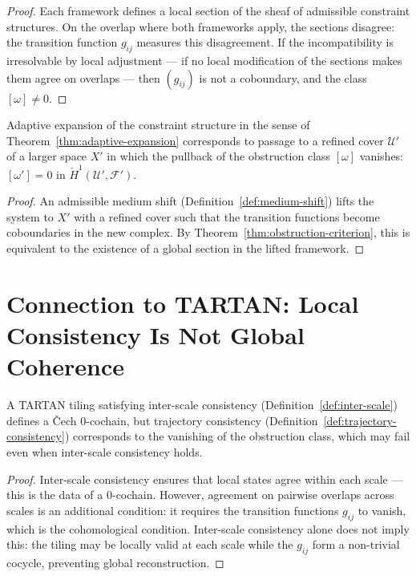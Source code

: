 \documentclass[11pt,openany]{book}
\begin{document}
\begin{proof}
Each framework defines a local section of the sheaf of
admissible constraint structures.  On the overlap where
both frameworks apply, the sections disagree: the
transition function $g_{ij}$ measures this disagreement.
If the incompatibility is irresolvable by local
adjustment — if no local modification of the sections
makes them agree on overlaps — then $(g_{ij})$ is not a
coboundary, and the class $[\omega] \neq 0$.
\end{proof}

\begin{corollary}
\label{cor:expansion-trivialisation}
Adaptive expansion of the constraint structure in the sense
of Theorem~\ref{thm:adaptive-expansion} corresponds to
passage to a refined cover $\mathcal{U}'$ of a larger
space $X'$ in which the pullback of the obstruction class
$[\omega]$ vanishes: $[\omega'] = 0$ in
$\check{H}^1(\mathcal{U}', \mathcal{F}')$.
\end{corollary}

\begin{proof}
An admissible medium shift (Definition~\ref{def:medium-shift})
lifts the system to $X'$ with a refined cover such that the
transition functions become coboundaries in the new complex.
By Theorem~\ref{thm:obstruction-criterion}, this is
equivalent to the existence of a global section in the
lifted framework.
\end{proof}

\section{Connection to TARTAN: Local Consistency Is Not Global Coherence}
\label{sec:tartan-connection}

\begin{proposition}
\label{prop:tartan-obstruction-app}
A TARTAN tiling satisfying inter-scale consistency
(Definition~\ref{def:inter-scale}) defines a Čech
$0$-cochain, but trajectory consistency
(Definition~\ref{def:trajectory-consistency}) corresponds
to the vanishing of the obstruction class, which may fail
even when inter-scale consistency holds.
\end{proposition}

\begin{proof}
Inter-scale consistency ensures that local states agree
within each scale — this is the data of a $0$-cochain.
However, agreement on pairwise overlaps across scales is an
additional condition: it requires the transition functions
$g_{ij}$ to vanish, which is the cohomological condition.
Inter-scale consistency alone does not imply this: the
tiling may be locally valid at each scale while
the $g_{ij}$ form a non-trivial cocycle, preventing global
reconstruction.
\end{proof}
\end{document}
